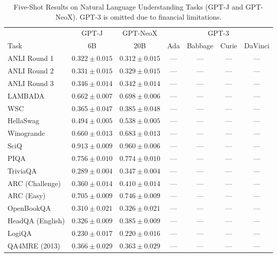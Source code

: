 \documentclass[11pt]{article}
\begin{document}
{\begin{landscape}
\begin{table}
\centering %
\begin{tabular}{l c c c c c c } \\
 & GPT-J & GPT-NeoX & \multicolumn{4}{c}{GPT-3} \\
Task & 6B & 20B & Ada & Babbage & Curie & DaVinci\\ \toprule
ANLI Round 1 & $0.322 \pm 0.015$ & $0.312 \pm 0.015$ & ---  & --- & --- & --- \\ 
ANLI Round 2 & $0.331 \pm 0.015$ & $0.329 \pm 0.015$ & ---  & --- & --- & --- \\ 
ANLI Round 3 & $0.346 \pm 0.014$ & $0.342 \pm 0.014$ & ---  & --- & --- & --- \\ 
LAMBADA & $0.662 \pm 0.007$ & $0.698 \pm 0.006$ & ---  & --- & --- & --- \\ 
WSC & $0.365 \pm 0.047$ & $0.385 \pm 0.048$ & ---  & --- & --- & --- \\ 
HellaSwag & $0.494 \pm 0.005$ & $0.538 \pm 0.005$ & ---  & --- & --- & --- \\ 
Winogrande & $0.660 \pm 0.013$ & $0.683 \pm 0.013$ & ---  & --- & --- & --- \\ 
SciQ & $0.913 \pm 0.009$ & $0.960 \pm 0.006$ & ---  & --- & --- & --- \\ 
PIQA & $0.756 \pm 0.010$ & $0.774 \pm 0.010$ & ---  & --- & --- & --- \\ 
TriviaQA & $0.289 \pm 0.004$ & $0.347 \pm 0.004$ & ---  & --- & --- & --- \\ 
ARC (Challenge) & $0.360 \pm 0.014$ & $0.410 \pm 0.014$ & ---  & --- & --- & --- \\ 
ARC (Easy) & $0.705 \pm 0.009$ & $0.746 \pm 0.009$ & ---  & --- & --- & --- \\ 
OpenBookQA & $0.310 \pm 0.021$ & $0.326 \pm 0.021$ & ---  & --- & --- & --- \\ 
HeadQA (English) & $0.326 \pm 0.009$ & $0.385 \pm 0.009$ & ---  & --- & --- & --- \\ 
LogiQA & $0.230 \pm 0.017$ & $0.220 \pm 0.016$ & ---  & --- & --- & --- \\ 
QA4MRE (2013) & $0.366 \pm 0.029$ & $0.363 \pm 0.029$ & ---  & --- & --- & --- \\ 
\bottomrule 
\end{tabular}
\caption{Five-Shot Results on Natural Language Understanding Tasks (GPT-J and GPT-NeoX). GPT-3 is omitted due to financial limitations.}
\label{tab:nlu_gpt_5}
\end{table}


\end{landscape}}
\end{document}
